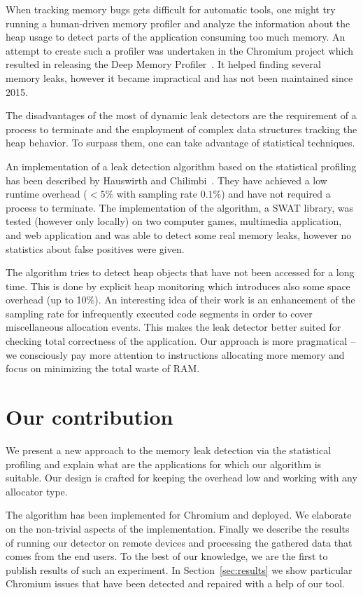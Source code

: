 \documentclass[preprint, numbers]{sigplanconf}
\begin{document}
When tracking memory bugs gets difficult for automatic tools, one might
try running a human-driven memory profiler and analyze the information about the heap usage
to detect parts of the application consuming too much memory.
An attempt to create such a profiler was undertaken in the Chromium project
which resulted in releasing the
Deep Memory Profiler~\cite{deep}.
It helped finding several memory leaks, however it became impractical
and has not been maintained since 2015.

The disadvantages of the most of dynamic leak detectors are the requirement of a process
to terminate and the employment of complex data structures tracking the heap behavior.
To surpass them, one can take advantage of statistical techniques.

An implementation of a leak detection algorithm based on the statistical profiling
has been described by Hauswirth and Chilimbi~\cite{hauswirth}.
They have achieved a low runtime overhead ($<5\%$ with sampling rate $0.1\%$) and have not required a process
to terminate.
The implementation of the algorithm, a SWAT library, was tested (however only locally) on two computer games, multimedia application,
and web application and was able to detect some real memory leaks, however no statistics about false positives were given.

The algorithm tries to detect heap objects that have not been accessed for a long time.
This is done by explicit heap monitoring which introduces also some space overhead (up to 10\%).
An interesting idea of their work is an enhancement of the sampling rate
for infrequently executed code segments in order to cover miscellaneous allocation events.
This makes the leak detector better suited for checking total correctness of
the application.
Our approach is more pragmatical -- we consciously pay more attention to instructions
allocating more memory and focus on minimizing the total waste of RAM.

\section{Our contribution}

We present a new approach to the memory leak detection via the statistical profiling
and explain what are the applications for which our algorithm is suitable.
Our design is crafted for keeping the overhead low and working with any
allocator type.

The algorithm has been implemented for Chromium and deployed.
We elaborate on the non-trivial aspects of the implementation.
Finally we describe the results of running our detector on remote
devices and processing the gathered data that comes from the end users.
To the best of our knowledge, we are the first to publish results
of such an experiment.
In Section~\ref{sec:results} we show particular Chromium issues
that have been detected and repaired with a help of our tool.
\end{document}
